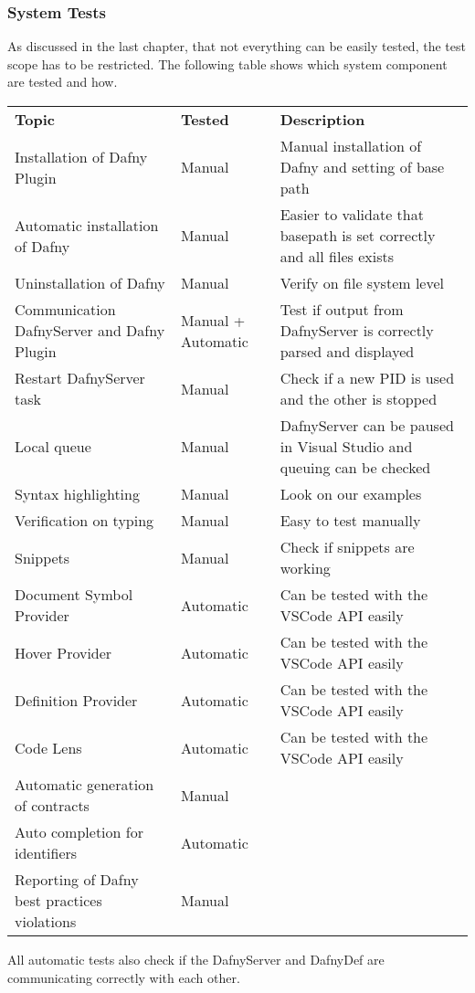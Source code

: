 \subsubsection{System Tests}
As discussed in the last chapter, that not everything can be easily tested, the test scope has to be restricted. The following table shows which system component are tested and how.
\begin{longtable}{ p{} | p{} | p{} }
\textbf{Topic} & \textbf{Tested} & \textbf{Description}\\
	Installation of Dafny Plugin & Manual & Manual installation of Dafny and setting of base path   \\
	Automatic installation of Dafny & Manual & Easier to validate that basepath is set correctly and all files exists \\
	Uninstallation of Dafny & Manual & Verify on file system level\\
	Communication DafnyServer and Dafny Plugin & Manual + Automatic & Test if output from DafnyServer is correctly parsed and displayed\\
	Restart DafnyServer task & Manual & Check if a new PID is used and the other is stopped\\
	Local queue & Manual & DafnyServer can be paused in Visual Studio and queuing can be checked \\
	Syntax highlighting & Manual & Look on our examples \\
	Verification on typing & Manual & Easy to test manually\\
	Snippets & Manual & Check if snippets are working\\
	Document Symbol Provider & Automatic & Can be tested with the VSCode API easily \\
	Hover Provider & Automatic & Can be tested with the VSCode API easily \\
	Definition Provider & Automatic & Can be tested with the VSCode API easily  \\
	Code Lens & Automatic & Can be tested with the VSCode API easily \\
	Automatic generation of contracts & Manual & \todo{add desc} \\
	Auto completion for identifiers & Automatic & \todo{add desc} \\
	Reporting of Dafny best practices violations & Manual & \todo{add desc} \\
\end{longtable}
All automatic tests also check if the DafnyServer and DafnyDef are communicating correctly with each other.


